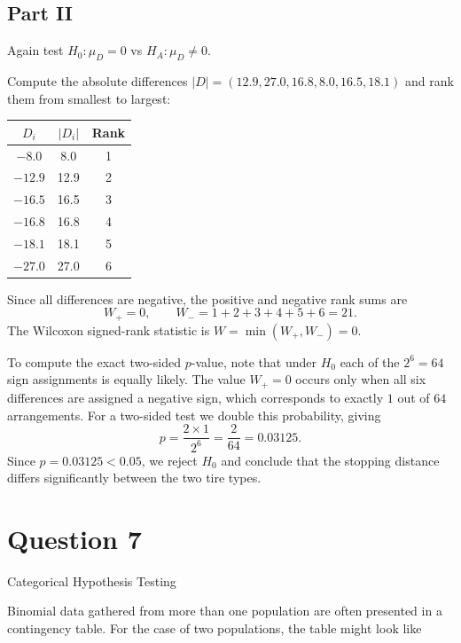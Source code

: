 \documentclass[letterpaper]{article}
\begin{document}
	\clearpage
	
	\subsection{Part II}
	
	Again test $H_0:\mu_D=0$ vs $H_A:\mu_D\ne 0$.
	
	Compute the absolute differences $|D|=(12.9,27.0,16.8,8.0,16.5,18.1)$ and rank them from smallest to largest:
	
	\begin{center}
		\begin{tabular}{ccc}
			\hline
			$D_i$ & $|D_i|$ & Rank \\
			\hline
			$-8.0$  & 8.0  & 1 \\
			$-12.9$ & 12.9 & 2 \\
			$-16.5$ & 16.5 & 3 \\
			$-16.8$ & 16.8 & 4 \\
			$-18.1$ & 18.1 & 5 \\
			$-27.0$ & 27.0 & 6 \\
			\hline
		\end{tabular}
	\end{center}
	
	Since all differences are negative, the positive and negative rank sums are
	$$W_+ = 0, \qquad W_- = 1+2+3+4+5+6 = 21.$$
	The Wilcoxon signed-rank statistic is $W = \min(W_+, W_-) = 0$.
	
	To compute the exact two-sided $p$-value, note that under $H_0$ each of the $2^6 = 64$ sign assignments is equally likely. The value $W_+ = 0$ occurs only when all six differences are assigned a negative sign, which corresponds to exactly $1$ out of $64$ arrangements. For a two-sided test we double this probability, giving
	$$p = \frac{2 \times 1}{2^6} = \frac{2}{64} = 0.03125.$$
	Since $p = 0.03125 < 0.05$, we reject $H_0$ and conclude that the stopping distance differs significantly between the two tire types.
	\clearpage
	
	\section{Question 7}
	
	{\color{deepred} Categorical Hypothesis Testing}
	
	\medskip
	
	Binomial data gathered from more than one population are often presented in a contingency table. 
	For the case of two populations, the table might look like
	
\end{document}

